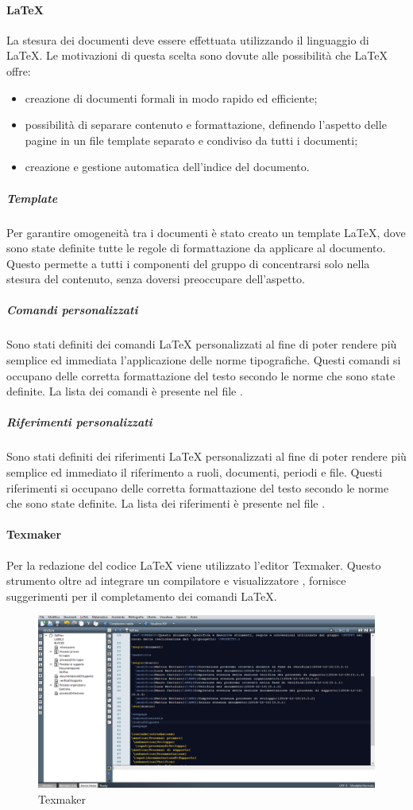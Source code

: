  \paragraph{\LaTeX{}}
La stesura dei documenti deve essere effettuata utilizzando il linguaggio di  \LaTeX{}. Le motivazioni di questa scelta sono dovute alle possibilità che \LaTeX{}{} offre:
\begin{itemize}
	\item creazione di documenti formali in modo rapido ed efficiente;
	\item possibilità di separare contenuto e formattazione, definendo l'aspetto delle pagine in un file
template separato e condiviso da tutti i documenti;
	\item creazione e gestione automatica dell'indice del documento.
\end{itemize}
\subparagraph{Template}
Per garantire omogeneità tra i documenti è stato creato un template \LaTeX{}, dove sono state definite tutte le regole di formattazione da applicare al documento. Questo permette a tutti i componenti del gruppo di concentrarsi solo nella stesura del contenuto, senza doversi preoccupare dell'aspetto.
\subparagraph{Comandi personalizzati}
Sono stati definiti dei comandi \LaTeX{} personalizzati al fine di poter rendere più semplice ed immediata
l’applicazione delle norme tipografiche. Questi comandi si occupano delle
corretta formattazione del testo secondo le norme che sono state definite. La
lista dei comandi è presente nel file .
\subparagraph{Riferimenti personalizzati}
Sono stati definiti dei riferimenti \LaTeX{} personalizzati al fine di poter rendere più semplice ed immediato
il riferimento a ruoli, documenti, periodi e file. Questi riferimenti si occupano delle
corretta formattazione del testo secondo le norme che sono state definite. La
lista dei riferimenti è presente nel file .
 \paragraph{Texmaker}
Per la redazione del codice \LaTeX{} viene utilizzato l'editor Texmaker. Questo
strumento oltre ad integrare un compilatore e visualizzatore , fornisce suggerimenti per il completamento dei comandi \LaTeX{}.
\begin{figure}[h]
\centering

\includegraphics[scale=0.4]{img/texm.png}
\caption{Texmaker}\label{sec:Figura3}
\end{figure}
